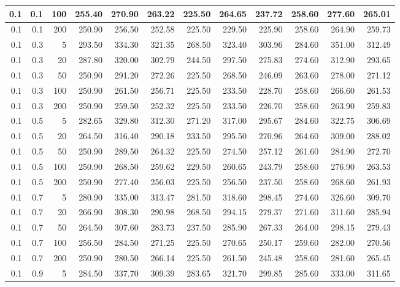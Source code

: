 \begin{longtable}{|r|r|r|r|r|r|r|r|r|r|r|r|}
		\hline
		0.1 & 0.1 & 100 & 255.40 & 270.90 & 263.22 & 225.50 & 264.65 & 237.72 & 258.60 & 277.60 & 265.01\\
		\hline
		0.1 & 0.1 & 200 & 250.90 & 256.50 & 252.58 & 225.50 & 229.50 & 225.90 & 258.60 & 264.90 & 259.73\\
		\hline
		0.1 & 0.3 & 5 & 293.50 & 334.30 & 321.35 & 268.50 & 323.40 & 303.96 & 284.60 & 351.00 & 312.49\\
		\hline
		0.1 & 0.3 & 20 & 287.80 & 320.00 & 302.79 & 244.50 & 297.50 & 275.83 & 274.60 & 312.90 & 293.65\\
		\hline
		0.1 & 0.3 & 50 & 250.90 & 291.20 & 272.26 & 225.50 & 268.50 & 246.09 & 263.60 & 278.00 & 271.12\\
		\hline
		0.1 & 0.3 & 100 & 250.90 & 261.50 & 256.71 & 225.50 & 233.50 & 228.70 & 258.60 & 266.60 & 261.53\\
		\hline
		0.1 & 0.3 & 200 & 250.90 & 259.50 & 252.32 & 225.50 & 233.50 & 226.70 & 258.60 & 263.90 & 259.83\\
		\hline
		0.1 & 0.5 & 5 & 282.65 & 329.80 & 312.30 & 271.20 & 317.00 & 295.67 & 284.60 & 322.75 & 306.69\\
		\hline
		0.1 & 0.5 & 20 & 264.50 & 316.40 & 290.18 & 233.50 & 295.50 & 270.96 & 264.60 & 309.00 & 288.02\\
		\hline
		0.1 & 0.5 & 50 & 250.90 & 289.50 & 264.32 & 225.50 & 274.50 & 257.12 & 261.60 & 284.90 & 272.70\\
		\hline
		0.1 & 0.5 & 100 & 250.90 & 268.50 & 259.62 & 229.50 & 260.65 & 243.79 & 258.60 & 276.90 & 263.53\\
		\hline
		0.1 & 0.5 & 200 & 250.90 & 277.40 & 256.03 & 225.50 & 256.50 & 237.50 & 258.60 & 268.60 & 261.93\\
		\hline
		0.1 & 0.7 & 5 & 280.90 & 335.00 & 313.47 & 281.50 & 318.60 & 298.45 & 274.60 & 326.60 & 309.70\\
		\hline
		0.1 & 0.7 & 20 & 266.90 & 308.30 & 290.98 & 268.50 & 294.15 & 279.37 & 271.60 & 311.60 & 285.94\\
		\hline
		0.1 & 0.7 & 50 & 264.50 & 307.60 & 283.73 & 237.50 & 285.90 & 267.33 & 264.00 & 298.15 & 279.43\\
		\hline
		0.1 & 0.7 & 100 & 256.50 & 284.50 & 271.25 & 225.50 & 270.65 & 250.17 & 259.60 & 282.00 & 270.56\\
		\hline
		0.1 & 0.7 & 200 & 250.90 & 280.50 & 266.14 & 225.50 & 261.50 & 245.48 & 258.60 & 281.60 & 265.45\\
		\hline
		0.1 & 0.9 & 5 & 284.50 & 337.70 & 309.39 & 283.65 & 321.70 & 299.85 & 285.60 & 333.00 & 311.65\\

\end{longtable}
